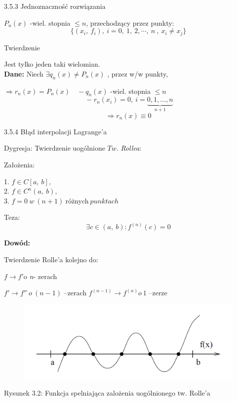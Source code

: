 \begin{frame}{3.5.3 Jednoznaczność rozwiązania}

$P_{n}(x)$ -wiel. stopnia $\leq n$, przechodzący przez punkty:
$$
\{(x_{i},\ f_{i}),\ i=0,\ 1,\ 2,\cdots ,\ n\ ,\ x_{i}\neq x_{j}\}
$$

\begin{block}{Twierdzenie}

Jest tylko jeden taki wielomian.\\
\vspace{2mm}
\textbf{Dane:} Niech $\exists q_{n}(x)\neq P_{n}(x)$ , przez w/w punkty,

$\Rightarrow r_{n}(x)=P_{n}(x) \quad -q_{n}(x)$ -wiel. stopnia $\leq n$
$$
 \: -r_{n}(x_{i})=0,\ i=\underbrace{0,1, \dots, n}_{n+1}
$$
$$
\Rightarrow r_{n}(x)\equiv 0
$$
\end{block}
\end{frame}

\begin{frame}{3.5.4 Błąd interpolacji Lagrange'a}

\begin{block}
{Dygresja: Twierdzenie uogólnione $Tw$. {\it Rollea}:}

Założenia:
\begin{center}
1. $f\in C[a,\ b],$ \\
2. $f\in C^{n}(a,\ b),$  \\
3. $f=0\: w\: (n+1)\: $różnych$ \:punktach$
\end{center}


Teza:
$$
\exists c\in(a,\ b):f^{(n)}(c)=0
$$
\end{block}
\textbf{Dowód:}

Twierdzenie Rolle'a kolejno do:

$f \rightarrow f'\mathrm{o}$ {\it n}- zerach

$f' \rightarrow f'' \:o\:(n-1)$ --zerach \newline
$f^{(n-1)} \rightarrow f^{(n)} o\: 1$ \: --zerze
 \end{frame}
 
 \begin{frame}
 \begin{figure}[h]
			\includegraphics[width=1 \linewidth]{img/3/interpol_3_5}
	\end{figure}
Rysunek 3.2: Funkcja spelniająca zalożenia uogólnionego tw. Rolle'a 
 \end{frame}
 
